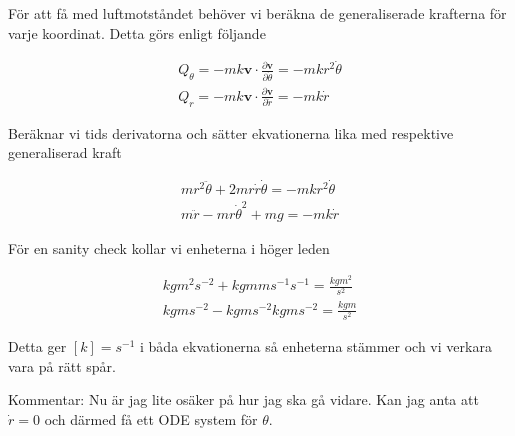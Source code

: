 \documentclass[a4paper]{article}
\begin{document}
För att få med luftmotståndet behöver vi beräkna de generaliserade krafterna för varje koordinat. Detta görs enligt följande

\begin{align}
    Q_{\theta} = -mk\mathbf{v} \cdot \frac{\partial \mathbf{v}}{\partial \dot{\theta}} = -mkr^2\dot{\theta} \\
    Q_r = -mk\mathbf{v} \cdot \frac{\partial \mathbf{v}}{\partial \dot{r}} = -mk\dot{r}
\end{align}



Beräknar vi tids derivatorna och sätter ekvationerna lika med respektive generaliserad kraft

\begin{align}
    mr^2\ddot{\theta} + 2mr\dot{r}\dot{\theta} = -mkr^2\dot{\theta}\\
    m\ddot{r} - mr\dot{\theta}^2 + mg = -mk\dot{r}
\end{align}

För en sanity check kollar vi enheterna i höger leden

\begin{align}
    kg m^2 s^{-2} + kg m m s^{-1} s^{-1} = \frac{kgm^2}{s^2} \\
    kg m s^{-2} - kg m s^{-2} kg m s^{-2} = \frac{kgm}{s^2}
\end{align}

Detta ger $[k] = s^{-1}$ i båda ekvationerna så enheterna stämmer och vi verkara vara på rätt spår. 


Kommentar:
Nu är jag lite osäker på hur jag ska gå vidare. Kan jag anta att $\dot{r} = 0$ och därmed få ett ODE system för $\theta$.
\end{document}
